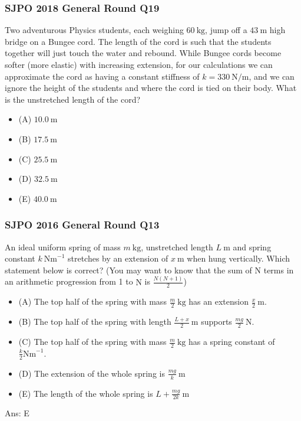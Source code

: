 \documentclass{article}
\begin{document}
\subsubsection{SJPO 2018 General Round Q19}
Two adventurous Physics students, each weighing $60 \mathrm{~kg}$, jump off a $43 \mathrm{~m}$ high bridge on a Bungee cord. The length of the cord is such that the students together will just touch the water and rebound. While Bungee cords become softer (more elastic) with increasing extension, for our calculations we can approximate the cord as having a constant stiffness of $k=330 \mathrm{~N} / \mathrm{m}$, and we can ignore the height of the students and where the cord is tied on their body. What is the unstretched length of the cord?
\begin{itemize}
\item[] (A) $10.0 \mathrm{~m}$
\item[] (B) $17.5 \mathrm{~m}$
\item[] (C) $25.5 \mathrm{~m}$
\item[] (D) $32.5 \mathrm{~m}$
\item[] (E) $40.0 \mathrm{~m}$
\end{itemize}
\subsubsection{SJPO 2016 General Round Q13}
An ideal uniform spring of mass $m \mathrm{~kg}$, unstretched length $L \mathrm{~m}$ and spring constant $k\  \mathrm{Nm}^{-1}$ stretches by an extension of $x \mathrm{~m}$ when hung vertically. Which statement below is correct? (You may want to know that the sum of $\mathrm{N}$ terms in an arithmetic progression from 1 to $\mathrm{N}$ is $\frac{N(N+1)}{2}$)
\begin{itemize}
\item[] (A) The top half of the spring with mass $\frac{m}{2} \mathrm{~kg}$ has an extension $\frac{x}{2} \mathrm{~m}$.
\item[] (B) The top half of the spring with length $\frac{L+x}{2} \mathrm{~m}$ supports $\frac{m g}{2} \mathrm{~N}$.
\item[] (C) The top half of the spring with mass $\frac{m}{2} \mathrm{~kg}$ has a spring constant of $\frac{k}{2} \mathrm{Nm}^{-1}$.
\item[] (D) The extension of the whole spring is $\frac{m g}{k} \mathrm{~m}$
\item[] (E) The length of the whole spring is $L+\frac{m g}{2 k} \mathrm{~m}$
\end{itemize}
Ans: \ifpaper E \fi
\end{document}
